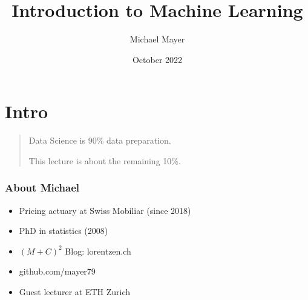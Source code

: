 \documentclass[
    utf8,
    aspectratio=169
]{beamer}  %
\title{Introduction to Machine Learning}
\author{Michael Mayer}
\date{October 2022}
\begin{document}

\frame{\titlepage}


\section{Intro}

\begin{frame}
\begin{quotation}
	\begin{huge}
		\begin{center}
			Data Science is 90\% data preparation.
	
			This lecture is about the remaining 10\%.
		\end{center}
	\end{huge}
\end{quotation}
\end{frame}

\begin{frame}
\frametitle{About Michael}
\begin{itemize}
	\item Pricing actuary at Swiss Mobiliar (since 2018)
	\item PhD in statistics (2008)
	\item $(M+C)^2$ Blog: lorentzen.ch
	\item github.com/mayer79
	\item Guest lecturer at ETH Zurich
\end{itemize}
\end{frame}
\end{document}
